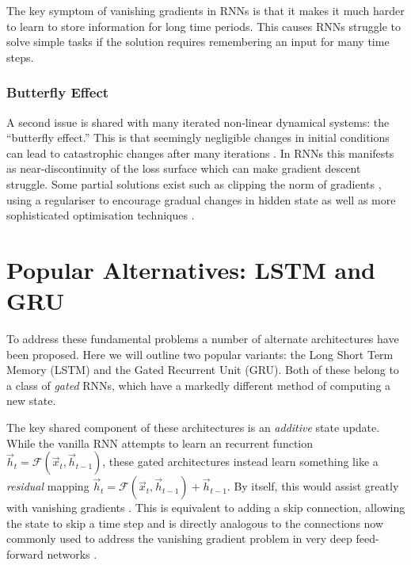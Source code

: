 The key symptom of vanishing gradients in RNNs is that it makes it much harder to learn to
store information for long time periods. This causes RNNs struggle to
solve simple tasks if the solution requires remembering an input for many
time steps.

\subsubsection{Butterfly Effect}
A second issue is shared with many iterated non-linear	
dynamical systems: the ``butterfly effect.'' This is that seemingly negligible changes
in initial conditions can lead to catastrophic changes after many iterations
\autocite{Lorenz1963}. In RNNs this manifests as near-discontinuity of the loss surface
which can make gradient descent struggle.
Some
partial solutions exist such as clipping the norm of gradients \autocite{Pascanu2012},
using a regulariser to encourage gradual changes in hidden state \autocite{Krueger2016}
as well as more sophisticated optimisation techniques \autocite{Martens2011}.

\section{Popular Alternatives: LSTM and GRU}
To address these fundamental problems a number of alternate architectures have been proposed.
Here we will outline two popular variants: the Long Short Term Memory (LSTM) and the Gated
Recurrent Unit (GRU). Both of these belong to a class of \emph{gated} RNNs, which have a
markedly different method of computing a new state.

The key shared component of these architectures is an \emph{additive} state update. 
While the vanilla RNN attempts to learn an recurrent function
\(\vec{h}_t = \mathcal{F}(\vec{x}_t, \vec{h}_{t-1})\), these gated architectures instead learn
something like
a \emph{residual} mapping \(\vec{h}_t = \mathcal{F}(\vec{x}_t, \vec{h}_{t-1}) + \vec{h}_{t-1}\).
By itself, this would assist greatly with vanishing gradients 
\autocite{Jozefowicz2015, Hochreiter1997}. This is equivalent to adding a skip connection,
allowing the state to skip a time step and is directly analogous to the connections
now commonly used to address the vanishing gradient problem in very deep feed-forward networks
\autocite{He2015, Duvenaud2014, Szegedy2016}.

